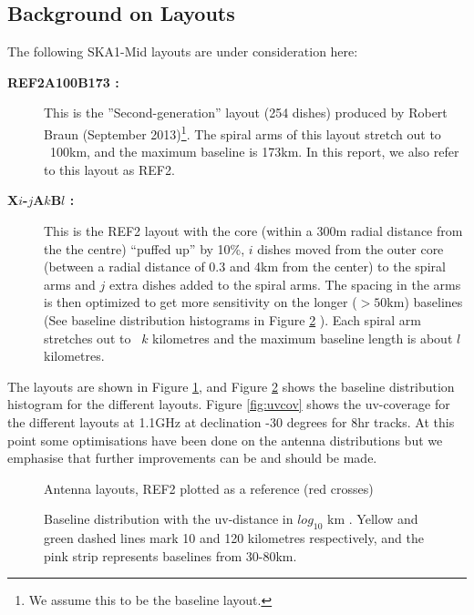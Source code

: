 \documentclass[sfheadings,a4paper,times,9pt,floats,floatfix]{article}
\begin{document}
\subsection{Background on Layouts}\label{sec:layouts}
\vspace{-.1cm}
The following SKA1-Mid layouts are under consideration here:
\begin{description}
\item[{\bf REF2A100B173 :}] This is the ”Second-generation” layout (254 dishes) produced by Robert Braun (September
2013)\footnote{We assume this to be the baseline layout.}. The spiral arms of this layout stretch out to ~100km, and the maximum
baseline is 173km. In this report, we also refer to this layout as REF2. \item[{\bf X$i$-$j$A$k$B$l$ :}] This is the REF2 layout
with the core (within a 300m radial distance from the the centre) ``puffed up'' by 10\%, $i$ dishes moved from the outer core
(between a radial distance of 0.3 and 4km from the center) to the spiral arms and $j$ extra dishes added to the spiral arms. The
spacing in the arms is then optimized to get more sensitivity on the longer ($>50$km) baselines (See baseline distribution
histograms in Figure \ref{fig:hist} ). Each spiral arm stretches out to ~$k$ kilometres and the maximum baseline length is about
$l$ kilometres.
\end{description}
The  layouts are shown in Figure \ref{fig:lay}, and Figure \ref{fig:hist} shows the baseline distribution histogram for the
different layouts. Figure \ref{fig:uvcov} shows the uv-coverage for the different layouts at 1.1GHz at declination -30 degrees for
8hr tracks. At this point some optimisations have been done on the antenna distributions but we emphasise that further
improvements can be and should be made.
\begin{figure}[!htb]
\vspace{-.5cm}
 \tiny{}
 \caption{Antenna layouts, REF2 plotted as a reference (red crosses)}\label{fig:lay}
\end{figure}

\begin{figure}[!htb]
\vspace{-.5cm}
 \tiny{}
 \caption{Baseline distribution with the uv-distance in $log_{10}$ km . Yellow and green dashed lines mark 10 and 120
kilometres respectively, and the pink strip represents baselines from 30-80km.}\label{fig:hist}
\end{figure}
\end{document}
